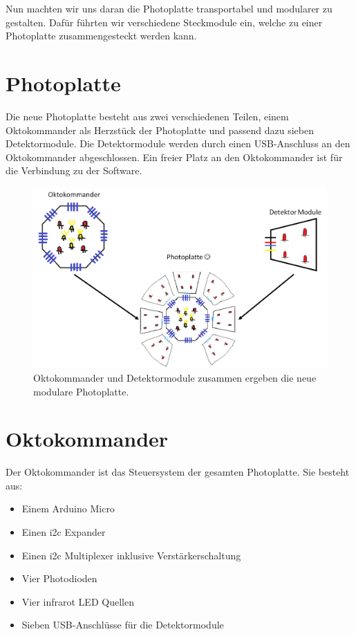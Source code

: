 \documentclass{sciposter}
\begin{document}
\begin{multicols}{3}
Nun machten wir uns daran die Photoplatte transportabel und modularer zu gestalten. Dafür führten wir verschiedene Steckmodule ein, welche zu einer Photoplatte zusammengesteckt werden kann. 

\section{Photoplatte}
Die neue Photoplatte besteht aus zwei verschiedenen Teilen, einem Oktokommander als Herzstück der Photoplatte und passend dazu sieben Detektormodule. Die Detektormodule werden durch einen USB-Anschluss an den Oktokommander abgeschlossen. Ein freier Platz an den Oktokommander ist für die Verbindung zu der Software.

\begin{figure}[h]
	\centering
	\includegraphics[scale=0.8]{figures/Photoplatte.png}
	\caption{Oktokommander und Detektormodule zusammen ergeben die neue modulare Photoplatte.}
	\label{fig:Sensorhandschuh}
\end{figure}

\section{Oktokommander}
Der Oktokommander ist das Steuersystem der gesamten Photoplatte. Sie besteht aus:
\begin{itemize}
\item Einem Arduino Micro
\item Einen i2c Expander
\item Einen i2c Multiplexer inklusive Verstärkerschaltung
\item Vier Photodioden
\item Vier infrarot LED Quellen
\item Sieben USB-Anschlüsse für die Detektormodule
\end{itemize}


\end{multicols}
\end{document}

